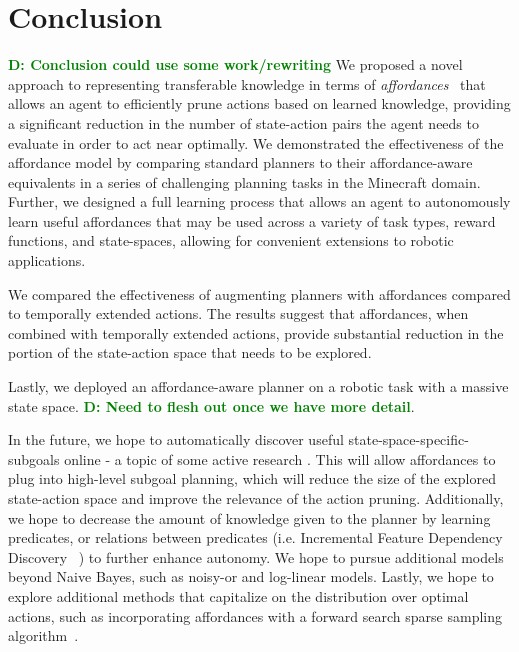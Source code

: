 \documentclass[conference]{IEEEtran}
\newcommand{\dnote}[1]{\textcolor{Green}{\textbf{D: #1}}}
\begin{document}
\section{Conclusion}
\label{sec:conclusion}
\dnote{Conclusion could use some work/rewriting}
We proposed a novel approach to representing transferable knowledge in terms of
{\em affordances}~\cite{gibson77} that allows an agent to efficiently prune actions 
based on learned knowledge, providing a significant reduction in the number of state-action
pairs the agent needs to evaluate in order to act near optimally. We demonstrated the 
effectiveness of the affordance model by comparing standard planners to their affordance-aware
equivalents in a series of challenging planning tasks in the Minecraft domain. Further, we designed
a full learning process that allows an agent to autonomously learn useful affordances that may be used
across a variety of task types, reward functions, and state-spaces, allowing for convenient extensions 
to robotic applications.

We compared the effectiveness of augmenting planners with affordances compared to 
temporally extended actions. The results suggest that affordances, when combined with 
temporally extended actions, provide substantial reduction in the portion of the state-action 
space that needs to be explored.

Lastly, we deployed an affordance-aware planner on a robotic task with a massive 
state space. \dnote{Need to flesh out once we have more detail}.

In the future, we hope to automatically discover useful state-space-specific-subgoals online 
- a topic of some active research \cite{Mcgovern01automaticdiscovery,Simsek:2005:IUS:1102351.1102454}.
This will allow affordances to plug into high-level subgoal planning, which will reduce the size of the 
explored state-action space and improve the relevance of the action pruning. Additionally, we hope to 
decrease the amount of knowledge given to the planner by learning predicates, or relations between predicates (i.e. Incremental Feature Dependency Discovery ~\cite{ICML2011Geramifard_473}) to further enhance autonomy. We hope to pursue additional models beyond Naive Bayes, such as noisy-or and log-linear models. Lastly, we hope to explore additional methods that capitalize on the distribution over optimal actions, such as incorporating affordances with a forward search sparse sampling algorithm~\cite{walsh2010integrating}.

{\small


}
\end{document}
